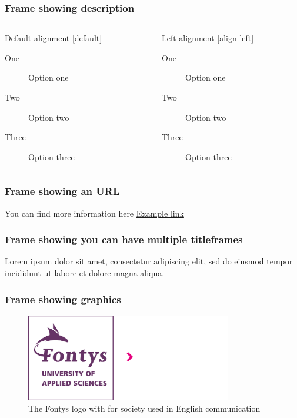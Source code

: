 \documentclass[aspectratio=169]{beamer}
\begin{document}
\begin{frame}
    \frametitle{Frame showing description}

    \begin{columns}
        \begin{column}{0.5\textwidth}
            Default alignment
            [default]
            \begin{description}%
                \item[One] Option one%
                \item[Two] Option two%
                \item[Three] Option three%
            \end{description}%
        \end{column}
        \begin{column}{0.5\textwidth}
            Left alignment
            [align left]
            \begin{description}%
                \item[One] Option one%
                \item[Two] Option two%
                \item[Three] Option three%
            \end{description}%
        \end{column}
    \end{columns}

\end{frame}

\begin{frame}
    \frametitle{Frame showing an URL}
    
    You can find more information here \href{http://www.example.com}{Example link}

\end{frame}

\begin{titleframe}
    \frametitle{Frame showing you can have multiple titleframes}
    Lorem ipsum dolor sit amet, consectetur adipiscing elit, sed do eiusmod tempor incididunt ut labore et dolore magna aliqua. 
\end{titleframe}

\begin{frame}
    \frametitle{Frame showing graphics}
    
    \begin{figure}
        \centering
        \includegraphics[width=0.8\textwidth]{logo_purple_society_en.png}
        \caption{The Fontys logo with for society used in English communication}
        \label{fig:logo}
    \end{figure}

\end{frame}
\end{document}
